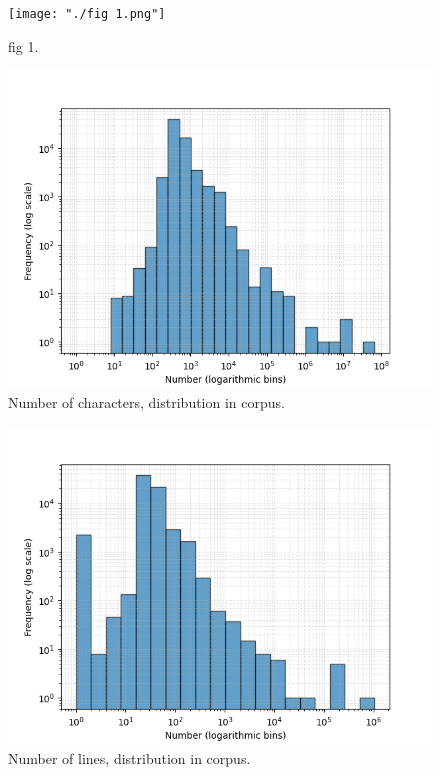 

\begin{figure}[htbp]
\centerline{\texttt{[image: "./fig 1.png"]}}
\caption{fig 1.}
\label{fig}
\end{figure}


\begin{figure}[htbp]
\centerline{\includegraphics[width=\linewidth]{"./Number of characters, distribution in corpus.png"}}
\caption{Number of characters, distribution in corpus.}
\label{fig}
\end{figure}


\begin{figure}[htbp]
\centerline{\includegraphics[width=\linewidth]{"./Number of lines, distribution in corpus.png"}}
\caption{Number of lines, distribution in corpus.}
\label{fig}
\end{figure}


